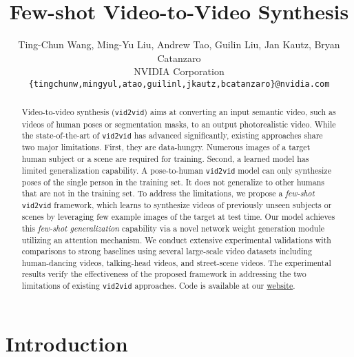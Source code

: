 \documentclass{article}
\title{Few-shot Video-to-Video Synthesis}
\author{
Ting-Chun Wang, Ming-Yu Liu, Andrew Tao, Guilin Liu, Jan Kautz, Bryan Catanzaro \vspace{2mm} \\
NVIDIA Corporation \vspace{2mm} \\
\vspace{2mm}
\texttt{\{tingchunw,mingyul,atao,guilinl,jkautz,bcatanzaro\}@nvidia.com}}
\newcommand{\vidtovid}{{\texttt{vid2vid}}\xspace}
\begin{document}
\maketitle

\begin{abstract}
	Video-to-video synthesis (\vidtovid) aims at converting an input semantic video, such as videos of human poses or segmentation masks, to an output photorealistic video. While the state-of-the-art of \vidtovid has advanced significantly, existing approaches share two major limitations. First, they are data-hungry. Numerous images of a target human subject or a scene are required for training. Second, a learned model has limited generalization capability. A pose-to-human \vidtovid model can only synthesize poses of the single person in the training set. It does not generalize to other humans that are not in the training set. To address the limitations, we propose a \textit{few-shot} \vidtovid framework, which learns to synthesize videos of previously unseen subjects or scenes by leveraging few example images of the target at test time. Our model achieves this \textit{few-shot generalization} capability via a novel network weight generation module utilizing an attention mechanism. We conduct extensive experimental validations with comparisons to strong baselines using several large-scale video datasets including human-dancing videos, talking-head videos, and street-scene videos. The experimental results verify the effectiveness of the proposed framework in addressing the two limitations of existing \vidtovid approaches. Code is available at our \href{https://nvlabs.github.io/few-shot-vid2vid}{website}.
\end{abstract}

\vspace{-4mm}
\section{Introduction}
\vspace{-2mm}
\end{document}
